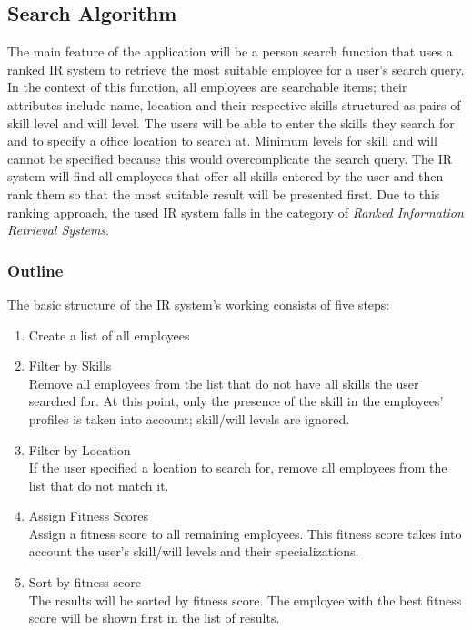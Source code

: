 \newpage

\subsection{Search Algorithm}
\label{Search_Algo_Main}
The main feature of the application will be a person search function that uses a ranked IR system to retrieve the most suitable employee for a user's search query.
In the context of this function, all employees are searchable items; their attributes include name, location and their respective skills structured as pairs of skill level and will level. The users will be able to enter the skills they search for and to specify a office location to search at. Minimum levels for skill and will cannot be specified because this would overcomplicate the search query. The IR system will find all employees that offer all skills entered by the user and then rank them so that the most suitable result will be presented first. Due to this ranking approach, the used IR system falls in the category of \textit{Ranked Information Retrieval Systems}.


\subsubsection{Outline}
The basic structure of the IR system's working consists of five steps:
\begin{enumerate}
  \item Create a list of all employees
  \item Filter by Skills\\
    Remove all employees from the list that do not have all skills the user searched for. At this point, only the presence of the skill in the employees' profiles is taken into account; skill/will levels are ignored.
  \item Filter by Location\\
    If the user specified a location to search for, remove all employees from the list that do not match it.
  \item Assign Fitness Scores\\
    Assign a fitness score to all remaining employees. This fitness score takes into account the user's skill/will levels and their specializations.
  \item Sort by fitness score\\
    The results will be sorted by fitness score. The employee with the best fitness score will be shown first in the list of results.
\end{enumerate}

